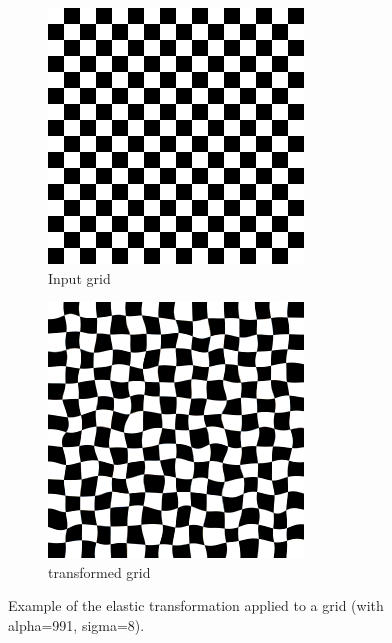 \begin{figure}
\centering
\begin{subfigure}{.4\textwidth}
  \centering
  \includegraphics[width=1\linewidth]{figures/preprocessing/elastic_transform_input.png}
  \caption{Input grid}
  \label{fig:input_elastic_transform}
\end{subfigure}%
\hfill
\begin{subfigure}{.4\textwidth}
  \centering
  \includegraphics[width=1\linewidth]{figures/preprocessing/elastic_transform.png}
  \caption{transformed grid}
  \label{fig:output_elastic_transfor}
\end{subfigure}
\caption[Elastic]{Example\footnotemark{} of the elastic transformation applied to a grid (with alpha=991, sigma=8).}
\label{fig:elastic_transform}
\end{figure}

